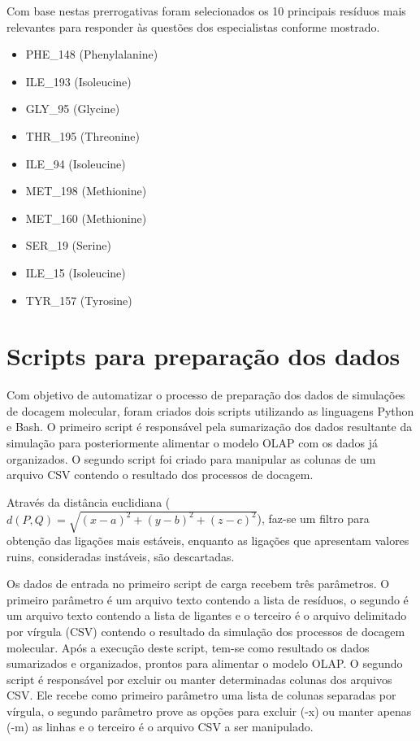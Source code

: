 Com base nestas prerrogativas foram selecionados os 10 principais resíduos mais relevantes para responder às questões dos especialistas conforme mostrado.

\begin{itemize}
	\item PHE\_148 (Phenylalanine)
	\item ILE\_193 (Isoleucine)
	\item GLY\_95 (Glycine)
	\item THR\_195 (Threonine)
	\item ILE\_94 (Isoleucine)
	\item MET\_198 (Methionine)
	\item MET\_160 (Methionine)
	\item SER\_19 (Serine)
	\item ILE\_15 (Isoleucine)
	\item TYR\_157 (Tyrosine)
\end{itemize}

\section{Scripts para preparação dos dados}

Com objetivo de automatizar o processo de preparação dos dados de simulações de docagem molecular, foram criados dois scripts utilizando as linguagens Python e Bash. O primeiro script é responsável pela sumarização dos dados resultante da simulação para posteriormente alimentar o modelo OLAP com os dados já organizados. O segundo script foi criado para manipular as colunas de um arquivo CSV contendo o resultado dos processos de docagem.

Através da distância euclidiana ($d(P, Q)= \sqrt{(x - a)^{2} +(y - b)^{2} + (z - c)^{2}}$), faz-se um filtro para obtenção das ligações mais estáveis, enquanto as ligações que apresentam valores ruins, consideradas instáveis, são descartadas.

Os dados de entrada no primeiro script de carga recebem três parâmetros. O primeiro parâmetro é um arquivo texto contendo a lista de resíduos, o segundo é um arquivo texto contendo a lista de ligantes e o terceiro é o arquivo delimitado por vírgula (CSV) contendo o resultado da simulação dos processos de docagem molecular. Após a execução deste script, tem-se como resultado os dados sumarizados e organizados, prontos para alimentar o modelo OLAP. O segundo script é responsável por excluir ou manter determinadas colunas dos arquivos CSV. Ele recebe como primeiro parâmetro uma lista de colunas separadas por vírgula, o segundo parâmetro prove as opções para excluir (-x) ou manter apenas (-m) as linhas e o terceiro é o arquivo CSV a ser manipulado.

